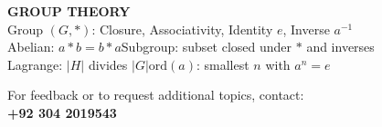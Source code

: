 \documentclass[12pt]{article}
\begin{document}
\begin{tcolorbox}
\vspace{6pt}

\begin{tcolorbox}[enhanced, colback=greenbg, colframe=greenclr, arc=3pt, boxrule=1pt, left=8pt, top=6pt, bottom=6pt]
{\small\bfseries\color{greenclr} GROUP THEORY}\\[4pt]
{\small
Group $(G,*)$: Closure, Associativity, Identity $e$, Inverse $a^{-1}$\\[4pt]
Abelian: $a*b=b*a$\hfill Subgroup: subset closed under $*$ and inverses\\[4pt]
Lagrange: $|H|$ divides $|G|$\hfill $\text{ord}(a)$: smallest $n$ with $a^n = e$
}
\end{tcolorbox}

\end{tcolorbox}

\vspace{20pt}
\begin{tcolorbox}[
  enhanced, arc=4pt, boxrule=1pt,
  colback=lightbg, colframe=accent!60,
  left=14pt, right=14pt, top=8pt, bottom=8pt,
]
\centering
{\small\color{darktext}For feedback or to request additional topics, contact:}\\[4pt]
{\normalsize\bfseries\color{primary}+92 304 2019543}
\end{tcolorbox}
\end{document}
